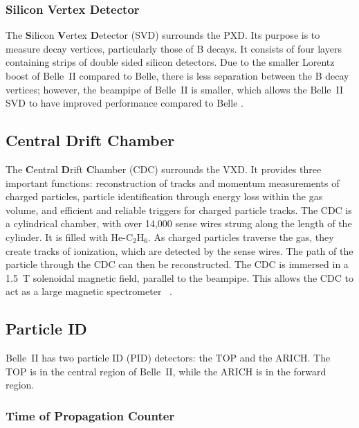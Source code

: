 \subsubsection{Silicon Vertex Detector}
\label{sec:SVD}

	The \textbf{S}ilicon \textbf{V}ertex \textbf{D}etector (SVD) surrounds the PXD. Its purpose is to measure decay vertices, particularly those of B decays. It consists of four layers containing strips of double sided silicon detectors. Due to the smaller Lorentz boost of Belle~II compared to Belle, there is less separation between the B decay vertices; however, the beampipe of Belle~II is smaller, which allows the Belle~II SVD to have improved performance compared to Belle \cite{BELLE2TDR}.

	


\subsection{Central Drift Chamber}
\label{sec:CDC}

	The \textbf{C}entral \textbf{D}rift \textbf{C}hamber (CDC) surrounds the VXD. It provides three important functions: reconstruction of tracks and momentum measurements of charged particles, particle identification through energy loss within the gas volume, and efficient and reliable triggers for charged particle tracks. The CDC is a cylindrical chamber, with over 14,000 sense wires strung along the length of the cylinder. It is filled with He-C$_2$H$_6$. As charged particles traverse the gas, they create tracks of ionization, which are detected by the sense wires. The path of the particle through the CDC can then be reconstructed. The CDC is immersed in a 1.5~T solenoidal magnetic field, parallel to the beampipe. This allows the CDC to act as a large magnetic spectrometer ~\cite{BELLE2TDR}.


\subsection{Particle ID}
\label{sec:PAID}

	Belle~II has two particle ID (PID) detectors: the TOP and the ARICH. The TOP is in the central region of Belle~II, while the ARICH is in the forward region.

\subsubsection{Time of Propagation Counter}
\label{sec:TOP}

